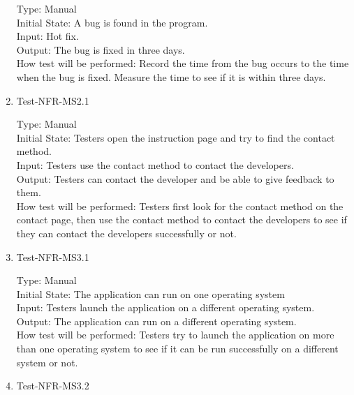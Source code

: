 \documentclass[12pt, titlepage]{article}
\begin{document}
\begin{enumerate}
Type: Manual\\

Initial State: A bug is found in the program.\\

Input: Hot fix.\\

Output: The bug is fixed in three days.\\

How test will be performed: Record the time from the bug occurs to the time when the bug is fixed. Measure the time to see if it is within three days. 

\item{Test-NFR-MS2.1\\}

Type: Manual\\

Initial State: Testers open the instruction page and try to find the contact method.\\

Input: Testers use the contact method to contact the developers.\\

Output: Testers can contact the developer and be able to give feedback to them.\\

How test will be performed: Testers first look for the contact method on the contact page, then use the contact method to contact the developers to see if they can contact the developers successfully or not.  

\item{Test-NFR-MS3.1\\}

Type: Manual\\

Initial State: The application can run on one operating system\\

Input: Testers launch the application on a different operating system.\\

Output: The application can run on a different operating system.\\

How test will be performed: Testers try to launch the application on more than one operating system to see if it can be run successfully on a different system or not.  

\item{Test-NFR-MS3.2\\}


\end{enumerate}
\end{document}
